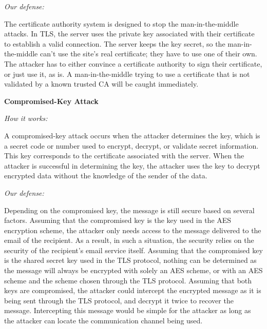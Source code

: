 \documentclass[a4paper,twoside,10pt]{report}
\begin{document}
\vspace{2.5mm}
\noindent
\textit{Our defense: }

The certificate authority system is designed to stop the man-in-the-middle attacks. In TLS, the server uses the private key associated with their certificate to establish a valid connection. The server keeps the key secret, so the man-in-the-middle can't use the site's real certificate; they have to use one of their own. The attacker has to either convince a certificate authority to sign their certificate, or just use it, as is. A man-in-the-middle trying to use a certificate that is not validated by a known trusted CA will be caught immediately.

\vspace{2.5mm}
\noindent
{\large\textbf{Compromised-Key Attack}}

\vspace{1mm}
\noindent
\textit{How it works: }

A compromised-key attack occurs when the attacker determines the key, which is a secret code or number used to encrypt, decrypt, or validate secret information. This key corresponds to the certificate associated with the server. When the attacker is successful in determining the key, the attacker uses the key to decrypt encrypted data without the knowledge of the sender of the data. 

\vspace{2.5mm}
\noindent
\textit{Our defense: }

Depending on the compromised key, the message is still secure based on several factors. Assuming that the compromised key is the key used in the AES encryption scheme, the attacker only needs access to the message delivered to the email of the recipient. As a result, in such a situation, the security relies on the security of the recipient's email service itself. Assuming that the compromised key is the shared secret key used in the TLS protocol, nothing can be determined as the message will always be encrypted with solely an AES scheme, or with an AES scheme and the scheme chosen through the TLS protocol. Assuming that both keys are compromised, the attacker could intercept the encrypted message as it is being sent through the TLS protocol, and decrypt it twice to recover the message. Intercepting this message would be simple for the attacker as long as the attacker can locate the communication channel being used.


\end{document}
